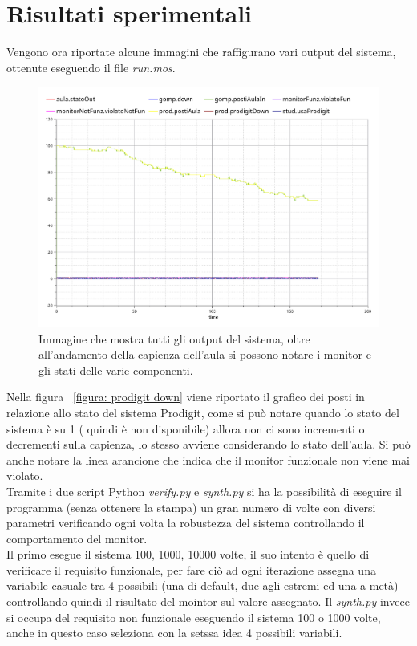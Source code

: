 \chapter*{Risultati sperimentali}
Vengono ora riportate alcune immagini che raffigurano vari output del sistema, ottenute eseguendo il file \textit{run.mos}.

\begin{figure}[htp]
\begin{center}
  \includegraphics[width=1 \textwidth]{Figure/plot finale.pdf}
    \caption{Immagine che mostra tutti gli output del sistema, oltre all’andamento della capienza dell’aula si possono notare i monitor e gli stati  delle varie componenti.} \label{figura: finale}
\end{center}
\end{figure}

Nella figura ~\ref{figura: prodigit down} viene riportato il grafico dei posti in relazione allo stato del sistema Prodigit, come si può notare quando lo stato del sistema è su 1 ( quindi è non disponibile) allora non ci sono incrementi o decrementi sulla capienza, lo stesso avviene considerando lo stato dell’aula.
Si può anche notare la linea arancione che indica che il monitor funzionale non viene mai violato.\\

Tramite i due script Python \textit{verify.py} e \textit{synth.py} si ha la possibilità di eseguire il programma (senza ottenere la stampa) un gran numero di volte con diversi parametri verificando ogni volta la robustezza del sistema controllando il comportamento del monitor.\\
Il primo esegue il sistema 100, 1000, 10000 volte,  il suo intento è quello di verificare il requisito funzionale, per fare ciò ad ogni iterazione assegna una variabile casuale tra 4 possibili (una di default, due agli estremi ed una a metà) controllando quindi il risultato del mointor sul valore assegnato. Il \textit{synth.py} invece si occupa del requisito non funzionale eseguendo il sistema 100 o 1000 volte, anche in questo caso seleziona con la setssa idea 4 possibili variabili.\\



